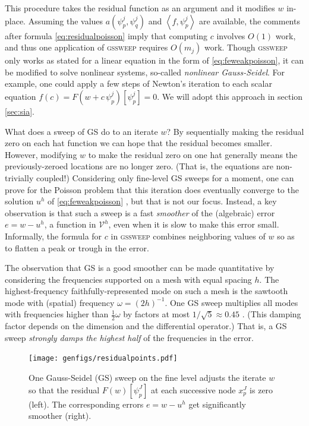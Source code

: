 \documentclass[letterpaper,final,12pt,reqno]{amsart}
\theoremstyle{claim}
\newcommand{\ip}[2]{\left<#1,#2\right>}
\numberwithin{equation}{section}
\numberwithin{figure}{section}
\numberwithin{table}{section}
\begin{document}
This procedure takes the residual function as an argument and it modifies $w$ in-place.  Assuming the values $a(\psi_p^j,\psi_q^j)$ and $\ip{f}{\psi_p^j}$ are available, the comments after formula \eqref{eq:residualpoisson} imply that computing $c$ involves $O(1)$ work, and thus one application of \textsc{gssweep} requires $O(m_j)$ work.  Though \textsc{gssweep} only works as stated for a linear equation in the form of \eqref{eq:feweakpoisson}, it can be modified to solve nonlinear systems, so-called \emph{nonlinear Gauss-Seidel}.  For example, one could apply a few steps of Newton's iteration to each scalar equation $f(c) = F(w+c\,\psi_p^j)[\psi_p^j] = 0$.  We will adopt this approach in section \ref{sec:sia}.

What does a sweep of GS do to an iterate $w$?  By sequentially making the residual zero on each hat function we can hope that the residual becomes smaller.  However, modifying $w$ to make the residual zero on one hat generally means the previously-zeroed locations are no longer zero.  (That is, the equations are non-trivially coupled!)  Considering only fine-level GS sweeps for a moment, one can prove for the Poisson problem that this iteration does eventually converge to the solution $u^h$ of \eqref{eq:feweakpoisson} \cite[for example]{Greenbaum1997}, but that is not our focus.  Instead, a key observation is that such a sweep is a fast \emph{smoother} of the (algebraic) error $e=w-u^h$, a function in $\mathcal{V}^h$, even when it is slow to make this error small.  Informally, the formula for $c$ in \textsc{gssweep} combines neighboring values of $w$ so as to flatten a peak or trough in the error.

The observation that GS is a good smoother can be made quantitative by considering the frequencies supported on a mesh with equal spacing $h$.  The highest-frequency faithfully-represented mode on such a mesh is the sawtooth mode with (spatial) frequency $\omega=(2h)^{-1}$.  One GS sweep multiplies all modes with frequencies higher than $\frac{1}{2} \omega$ by factors at most $1/\sqrt{5}\approx 0.45$ \cite[Chapter 4]{Briggsetal2000}.  (This damping factor depends on the dimension and the differential operator.)  That is, a GS sweep \emph{strongly damps the highest half} of the frequencies in the error.

\begin{figure}[t]
\texttt{[image: genfigs/residualpoints.pdf]}
\caption{One Gauss-Seidel (GS) sweep on the fine level adjusts the iterate $w$ so that the residual $F(w)[\psi_p^J]$ at each successive node $x_p^J$ is zero (left).  The corresponding errors $e=w-u^h$ get significantly smoother (right).}
\label{fig:residualpoints}
\end{figure}
\end{document}
